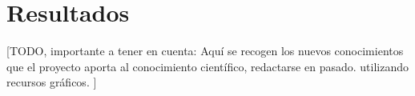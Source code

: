 \chapter{Resultados}
\label{cap:Resultados}

[TODO, importante a tener en cuenta:
Aquí se recogen los nuevos conocimientos que el proyecto aporta al conocimiento científico, redactarse en pasado.
utilizando recursos gráficos.
]
